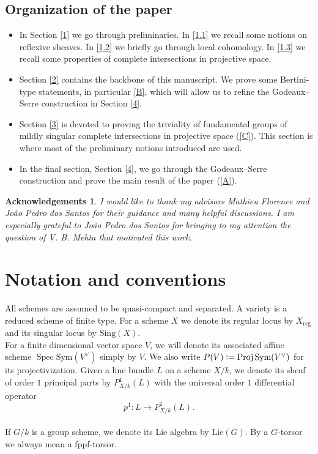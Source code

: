 \documentclass[a4paper,12pt]{amsart}
\newtheorem*{acknowledgements}{Acknowledgements}
\numberwithin{equation}{section}
\newcommand{\defeq}{\vcentcolon=}
\DeclareMathOperator{\Spec}{Spec}
\DeclareMathOperator{\Proj}{Proj}
\renewcommand{\_}{\rule{0.25cm}{0.4pt}}
\begin{document}
\subsection*{Organization of the paper}
\begin{itemize}
    \item In Section \ref{1} we go through preliminaries. In \ref{1.1} we recall some notions on reflexive sheaves. In \ref{1.2} we briefly go through local cohomology. In \ref{1.3} we recall some properties of complete intersections in projective space.
    \item Section \ref{2} contains the backbone of this manuscript. We prove some Bertini-type statements, in particular \ref{B}, which will allow us to refine the Godeaux--Serre construction in Section \ref{4}.
    \item Section \ref{3} is devoted to proving the triviality of fundamental groups of mildly singular complete intersections in projective space (\ref{C}). This section is where most of the preliminary notions introduced are used.
    \item In the final section, Section \ref{4}, we go through the Godeaux--Serre construction and prove the main result of the paper (\ref{A}).
\end{itemize}

\begin{acknowledgements}
I would like to thank my advisors Mathieu Florence and João Pedro dos Santos for their guidance and many helpful discussions. I am especially grateful to João Pedro dos Santos for bringing to my attention the question of V. B. Mehta that motivated this work.
\end{acknowledgements}

\section*{Notation and conventions}
All schemes are assumed to be quasi-compact and separated. A variety is a reduced scheme of finite type. For a scheme $X$ we denote its regular locus by $X_{\text{reg}}$ and its singular locus by $\text{Sing}(X)$.
\\
For a finite dimensional vector space $V$, we will denote its associated affine scheme $\Spec \text{Sym}(V^{\vee})$ simply by $V$. We also write $P(V)\defeq \Proj \text{Sym}(V^{\vee})$ for its projectivization. Given a line bundle $L$ on a scheme $X/k$, we denote its sheaf of order $1$ principal parts by $P^{1}_{X/k}(L)$ with the universal order $1$ differential operator
\[
p^{1}\colon L\to P^{1}_{X/k}(L).
\]
\\
If $G/k$ is a group scheme, we denote its Lie algebra by $\text{Lie}(G)$. By a $G$-torsor we always mean a fppf-torsor.
\end{document}
